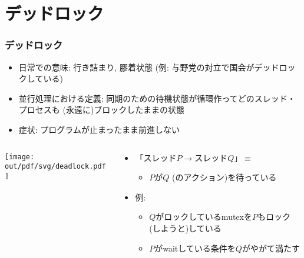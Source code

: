 \documentclass[12pt,dvipdfmx]{beamer}
\begin{document}
\section{デッドロック}
\begin{frame}
  \frametitle{デッドロック}
  \begin{itemize}
  \item 日常での意味: 行き詰まり, 膠着状態
    (例: 与野党の対立で国会がデッドロックしている)
  \item 並行処理における定義:
    同期のための待機状態が循環作ってどのスレッド・プロセスも
    (永遠に)ブロックしたままの状態
  \item 症状: プログラムが止まったまま前進しない
  \end{itemize}
  \begin{columns}
    \begin{column}{0.25\textwidth}
  \begin{center}
\texttt{[image: out/pdf/svg/deadlock.pdf]}
  \end{center}
    \end{column}
    \begin{column}{0.75\textwidth}
      \begin{itemize}
      \item 「スレッド$P \rightarrow$スレッド$Q$」$\equiv$
        \begin{itemize}
        \item [] $P$が$Q$ (のアクション)を待っている
        \end{itemize}
      \item 例:
        \begin{itemize}
        \item $Q$がロックしているmutexを$P$もロック(しようと)している
        \item $P$がwaitしている条件を$Q$がやがて満たす
        \end{itemize}
      \end{itemize}
    \end{column}    
  \end{columns}
\end{frame}
\end{document}
